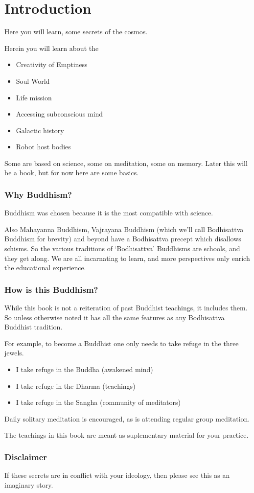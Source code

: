 \documentclass{report}
\begin{document}
\chapter{Introduction}
Here you will learn, some secrets of the cosmos.

Herein you will learn about the
\begin{itemize}
  \item Creativity of Emptiness
  \item Soul World
  \item Life mission
  \item Accessing subconscious mind
  \item Galactic history
  \item Robot host bodies
\end{itemize}

Some are based on science, some on meditation, some on memory. 
Later this will be a book, but for now here are some basics. 

\subsection{Why Buddhism?}
Buddhism was chosen because it is the most compatible with science.

Also Mahayanna Buddhism, Vajrayana Buddhism (which we'll call Bodhisattva
Buddhism for brevity) and beyond have a Bodhisattva 
precept which disallows schisms.  So the various traditions of `Bodhisattva'
Buddhisms are schools, 
and they get along. We are all incarnating to learn, and more perspectives only
enrich the educational experience.

\subsection{How is this Buddhism?}

While this book is not a reiteration of past Buddhist teachings, it includes
them. So unless otherwise noted it has all the same features as any Bodhisattva
Buddhist tradition.  

For example, to become a Buddhist one only needs to take refuge in the three
jewels.  

\begin{itemize}
  \item I take refuge in the Buddha (awakened mind)
  \item I take refuge in the Dharma (teachings)
  \item I take refuge in the Sangha (community of meditators)
\end{itemize}

Daily solitary meditation is encouraged, as is attending regular group
meditation.

The teachings in this book are meant as suplementary material for your
practice. 

\subsection{Disclaimer} 
If these secrets are in conflict with your ideology,
then please see this as an imaginary story. 
\end{document}
